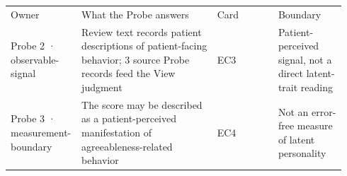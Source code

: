 \begin{tabular}{p{0.16\linewidth}p{0.40\linewidth}p{0.18\linewidth}p{0.20\linewidth}}
Owner & What the Probe answers & Card & Boundary \\
Probe 2 · observable-signal & Review text records patient descriptions of patient-facing behavior; 3 source Probe records feed the View judgment & EC3 & Patient-perceived signal, not a direct latent-trait reading \\
Probe 3 · measurement-boundary & The score may be described as a patient-perceived manifestation of agreeableness-related behavior & EC4 & Not an error-free measure of latent personality \\
\end{tabular}
